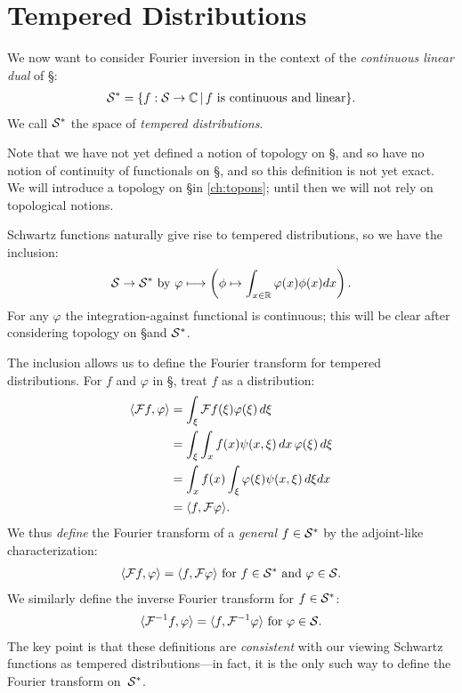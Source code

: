     \section{Tempered Distributions}
      \label{sec:tempdist}
      We now want to consider Fourier inversion in the context of the \emph{continuous linear dual} of \S:
      \begin{align*}
        \S^* = \{f:\S\rightarrow\C\,\vert\,f\text{ is continuous and linear}\} \text{.}
      \end{align*}
      We call $\S^*$ the space of \emph{tempered distributions}.

      Note that we have not yet defined a notion of topology on \S, and so have no notion of continuity of functionals on \S, and so this definition is not yet exact.
      We will introduce a topology on \S in \cref{ch:topons}; until then we will not rely on topological notions.

      Schwartz functions naturally give rise to tempered distributions, so we have the inclusion:
      \begin{align*}
        \S\rightarrow\S^*\text{ by }\varphi \longmapsto\left(\phi\mapsto\int_{x\in\R}\varphi(x)\phi(x)dx\right) \text{.}
      \end{align*}
      For any $\varphi$ the integration-against functional is continuous; this will be clear after considering topology on \S and $\S^*$.
      
      The inclusion allows us to define the Fourier transform for tempered distributions.
      For $f$ and $\varphi$ in \S, treat $f$ as a distribution:
      \begin{align*}
        \langle\F f,\varphi\rangle &= \int_\xi\F f(\xi)\varphi(\xi)\,d\xi\\
        &= \int_\xi\int_xf(x)\psi(x,\xi)\,dx\,\varphi(\xi)\,d\xi\\
        &= \int_xf(x)\int_\xi\varphi(\xi)\psi(x,\xi)\,d\xi dx\\
        &= \langle f,\F\varphi\rangle \text{.}
      \end{align*}
      We thus \emph{define} the Fourier transform of a \emph{general} $f\in\S^*$ by the adjoint-like characterization:
      \begin{align*}
        \langle\F f,\varphi\rangle = \langle f,\F\varphi\rangle \text{ for }f\in\S^*\text{ and }\varphi\in\S \text{.}
      \end{align*}
      We similarly define the inverse Fourier transform for $f\in\S^*$:
      \begin{align*}
        \langle\F^{-1}f,\varphi\rangle = \langle f,\F^{-1}\varphi\rangle\text{ for }\varphi\in\S \text{.}
      \end{align*}
      The key point is that these definitions are \emph{consistent} with our viewing Schwartz functions as tempered distributions---in fact, it is the only such way to define the Fourier transform on~$\S^*$.

